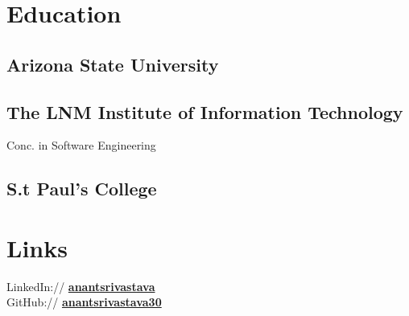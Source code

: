 \documentclass[hidelinks,letterpaper]{deedy-resume-openfont} %
\begin{document}
	\begin{minipage}[t]{0.33\textwidth} %
		
		
		\section{Education} 
		
		\subsection{Arizona State University}
		
		
		
		\sectionsep
		
		\subsection{The LNM Institute of Information Technology}
		
		Conc. in Software Engineering \\
		
		\sectionsep
		
		
		\subsection{S.t Paul's College}
		
		
		\sectionsep
		
		\vspace{-0.25cm}
		\section{Links} 
		
		LinkedIn:// \href{https://www.linkedin.com/pub/anant-srivastava/54/38/709}{\bf anantsrivastava} \\
		GitHub:// \href{https://github.com/anantsrivastava30}{\bf anantsrivastava30}
		

\end{minipage}
\end{document}
